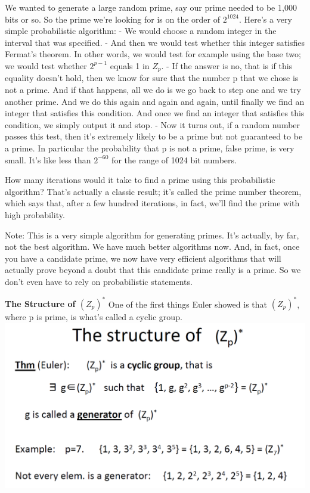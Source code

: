 \documentclass[11pt]{article}
\makeatletter
\def\maxwidth{\ifdim\Gin@nat@width>\linewidth\linewidth
    \else\Gin@nat@width\fi}
\let\Oldincludegraphics\includegraphics
\renewcommand{\includegraphics}[1]{\Oldincludegraphics[width=.8\maxwidth]{#1}}
\makeatother
\begin{document}
We wanted to generate a large random prime, say our prime needed to be
1,000 bits or so. So the prime we're looking for is on the order of
\(2^{1024}\). Here's a very simple probabilistic algorithm: - We would
choose a random integer in the interval that was specified. - And then
we would test whether this integer satisfies Fermat's theorem. In other
words, we would test for example using the base two; we would test
whether \(2^{p-1}\) equals 1 in \(Z_{p}\). - If the answer is no, that
is if this equality doesn't hold, then we know for sure that the number
p that we chose is not a prime. And if that happens, all we do is we go
back to step one and we try another prime. And we do this again and
again and again, until finally we find an integer that satisfies this
condition. And once we find an integer that satisfies this condition, we
simply output it and stop. - Now it turns out, if a random number passes
this test, then it's extremely likely to be a prime but not guaranteed
to be a prime. In particular the probability that p is not a prime,
false prime, is very small. It's like less than \(2^{-60}\) for the
range of 1024 bit numbers.

How many iterations would it take to find a prime using this
probabilistic algorithm? That's actually a classic result; it's called
the prime number theorem, which says that, after a few hundred
iterations, in fact, we'll find the prime with high probability.

Note: This is a very simple algorithm for generating primes. It's
actually, by far, not the best algorithm. We have much better algorithms
now. And, in fact, once you have a candidate prime, we now have very
efficient algorithms that will actually prove beyond a doubt that this
candidate prime really is a prime. So we don't even have to rely on
probabilistic statements.

\textbf{The Structure of \((Z_{p})^{*}\)} One of the first things Euler
showed is that \((Z_{p})^{*}\), where p is prime, is what's called a
cyclic group. \includegraphics{./Images/NT-StructureZP-Star.png}
\end{document}
